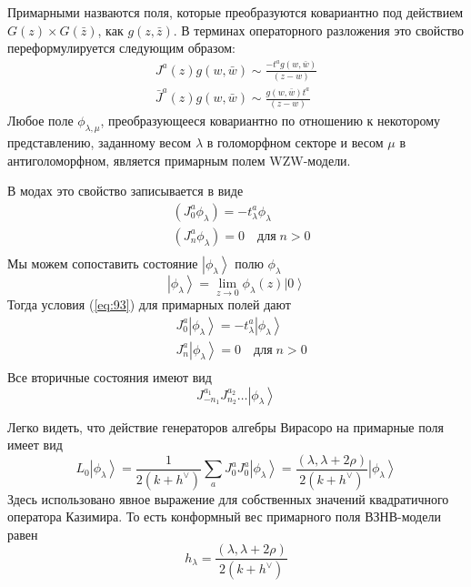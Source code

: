 Примарными назваются поля, которые преобразуются ковариантно под действием $G(z)\times G(\bar z)$,
как $g(z,\bar z)$. В терминах операторного разложения это свойство переформулируется следующим
образом:
\begin{equation}
  \label{eq:84}
  \begin{aligned}
    J^a(z)g(w,\bar w)\sim \frac{-t^a g(w,\bar w)}{(z-w)}\\
    \bar J^a(z)g(w,\bar w)\sim \frac{ g(w,\bar w)t^a}{(z-w)}
  \end{aligned}
\end{equation}
Любое поле $\phi_{\lambda,\mu}$, преобразующееся ковариантно по отношению к некоторому
представлению, заданному весом $\lambda$ в голоморфном секторе и весом $\mu$ в антиголоморфном,
является примарным полем WZW-модели.

В модах это свойство записывается в виде
\begin{equation}
  \label{eq:93}
  \begin{aligned}
    & (J_0^a \phi_{\lambda})=-t^a_{\lambda}\phi_{\lambda}\\
    & (J^a_n\phi_{\lambda})=0\quad \mbox{для}\; n>0\\
  \end{aligned}
\end{equation}
Мы можем сопоставить состояние $\left|\phi_{\lambda}\right>$ полю $\phi_{\lambda}$
  \begin{equation}
    \label{eq:94}
    \left|\phi_{\lambda}\right>=\lim_{z\to 0}\phi_{\lambda}(z)\left|0\right>
  \end{equation}
Тогда условия (\ref{eq:93}) для примарных полей дают
\begin{equation}
  \label{eq:95}
  \begin{aligned}
    & J_0^a\left|\phi_{\lambda}\right>=-t^a_{\lambda}\left|\phi_{\lambda}\right>\\
    & J^a_n\left|\phi_{\lambda}\right>=0 \quad \mbox{для}\; n>0 \\
  \end{aligned}
\end{equation}
Все вторичные состояния имеют вид
\begin{equation}
  \label{eq:97}
  J^{a_1}_{-n_1}J^{a_2}_{n_2}\dots\left|\phi_{\lambda}\right>
\end{equation}

Легко видеть, что действие генераторов алгебры Вирасоро на примарные поля имеет вид
\begin{equation}
  \label{eq:96}
  L_0\left|\phi_{\lambda}\right>=\frac{1}{2(k+h^{\vee})}\sum_aJ^a_0J^a_0\left|\phi_{\lambda}\right>=\frac{(\lambda,\lambda+2\rho)}{2(k+h^{\vee})}\left|\phi_{\lambda}\right>
\end{equation}
Здесь использовано явное выражение для собственных значений квадратичного оператора Казимира. То есть конформный вес примарного поля ВЗНВ-модели равен
\begin{equation}
  \label{eq:65}
  h_{\lambda}=\frac{(\lambda,\lambda+2\rho)}{2(k+h^{\vee})}
\end{equation}



